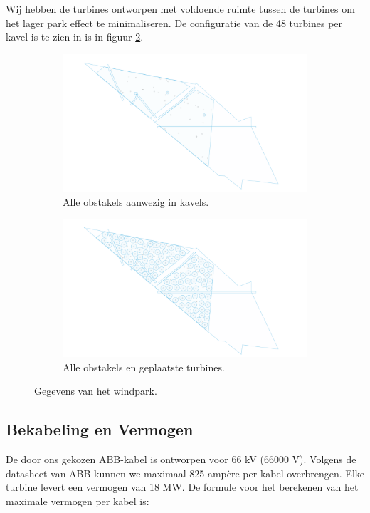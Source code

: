 Wij hebben de turbines ontworpen met voldoende ruimte tussen de turbines om het lager park effect te minimaliseren. De configuratie van de 48 turbines per kavel is te zien in is in figuur \ref{fig:windparkturbines}.
\begin{figure}[h]
    \centering
    \begin{subfigure}{0.5\textwidth}
        \centering
        \includegraphics[width=1\textwidth, angle=270]{IMG/Kavelindeling/Windpark v30_BG.png}
        \caption{Alle obstakels aanwezig in kavels.}
        \label{fig:windparkitems}
    \end{subfigure}%
    \begin{subfigure}{0.5\textwidth}
        \centering
        \includegraphics[width=1\textwidth, angle=270]{IMG/Kavelindeling/Windpark v30turbines.png}
        \caption{Alle obstakels en geplaatste turbines.}
        \label{fig:windparkturbines}
    \end{subfigure}
    \caption{Gegevens van het windpark.}
    \label{fig:windpark}
\end{figure}


\subsection{Bekabeling en Vermogen}
De door ons gekozen ABB-kabel is ontworpen voor 66 kV (66000 V). Volgens de datasheet van ABB kunnen we maximaal 825 ampère per kabel overbrengen. Elke turbine levert een vermogen van 18 MW. De formule voor het berekenen van het maximale vermogen per kabel is:

